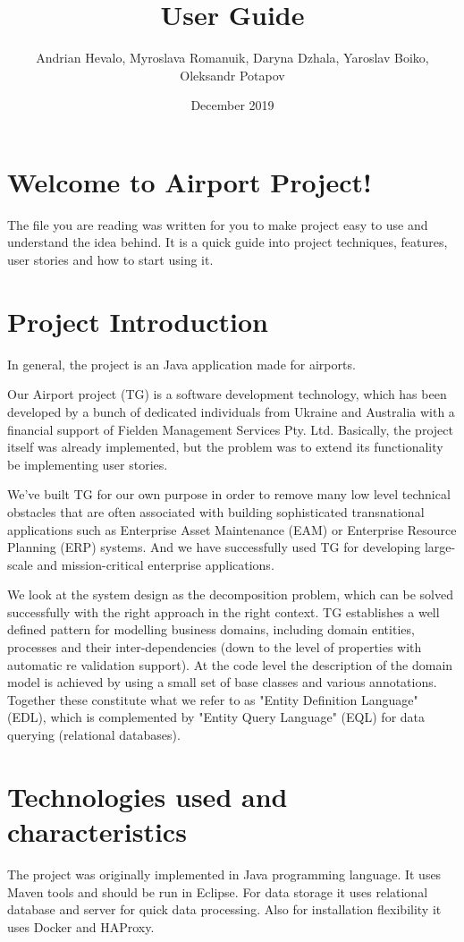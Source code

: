 \documentclass{article}
\title{User Guide}
\author{Andrian Hevalo, Myroslava Romanuik, Daryna Dzhala, Yaroslav Boiko, Oleksandr Potapov}
\date{December 2019}
\begin{document}
\maketitle

\section{Welcome to Airport Project!}
The file you are reading was written for you to make project easy to use and understand the idea behind. It is a quick guide into project techniques, features, user stories and how to start using it.

\section{Project Introduction}

In general, the project is an Java application made for airports.

Our Airport project (TG) is a software development technology, which has been developed by a bunch of dedicated individuals from Ukraine and Australia with a financial support of Fielden Management Services Pty. Ltd. Basically, the project itself was already implemented, but the problem was to extend its functionality be implementing user stories. 

We've built TG for our own purpose in order to remove many low level technical obstacles that are often associated with building sophisticated transnational applications such as Enterprise Asset Maintenance (EAM) or Enterprise Resource Planning (ERP) systems. And we have successfully used TG for developing large-scale and mission-critical enterprise applications.

We look at the system design as the decomposition problem, which can be solved successfully with the right approach in the right context. TG establishes a well defined pattern for modelling business domains, including domain entities, processes and their inter-dependencies (down to the level of properties with automatic re validation support). At the code level the description of the domain model is achieved by using a small set of base classes and various annotations. Together these constitute what we refer to as "Entity Definition Language" (EDL), which is complemented by "Entity Query Language" (EQL) for data querying (relational databases).


\section{Technologies used and characteristics}
The project was originally implemented in Java programming language. It uses Maven tools and should be run in Eclipse. For data storage it uses relational database and server for quick data processing. Also for installation flexibility it uses Docker and HAProxy.
\end{document}
